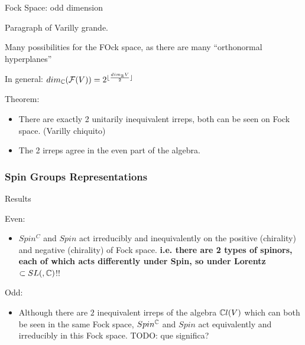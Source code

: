 \begin{frame}{Fock Space: odd dimension} %

    Paragraph of Varilly grande.
    
    Many possibilities for the FOck space, as there are many ``orthonormal hyperplanes''
    
    In general: $dim_\mathbb C (\mathcal F(V)) = 2^{\lfloor\frac{dim_\mathbb R V}{2} \rfloor}$
    
    Theorem: 
        \begin{itemize}
        
        \item There are exactly 2 unitarily inequivalent irreps, both can be seen on Fock space. (Varilly chiquito)
        
        \item The 2 irreps agree in the even part of the algebra.
        
        \end{itemize}

\end{frame}

\subsubsection{Spin Groups Representations}

\begin{frame}{Results} %

    Even:
        \begin{itemize}
            
        \item $Spin^C$ and $Spin$ act irreducibly and inequivalently on the positive (chirality) and negative (chirality) of Fock space. \textbf{i.e. there are 2 types of spinors, each of which acts differently under Spin, so under Lorentz $\subset SL(, \mathbb C)$}!!
            
        \end{itemize}
    
    Odd:
        \begin{itemize}
        
        \item Although there are $2$ inequivalent irreps of the algebra $\mathbb C l(V)$ which can both be seen in the same Fock space, $Spin^\mathbb C$ and $Spin$ act equivalently and irreducibly in this Fock space. TODO: que significa?
        
        \end{itemize}

\end{frame}